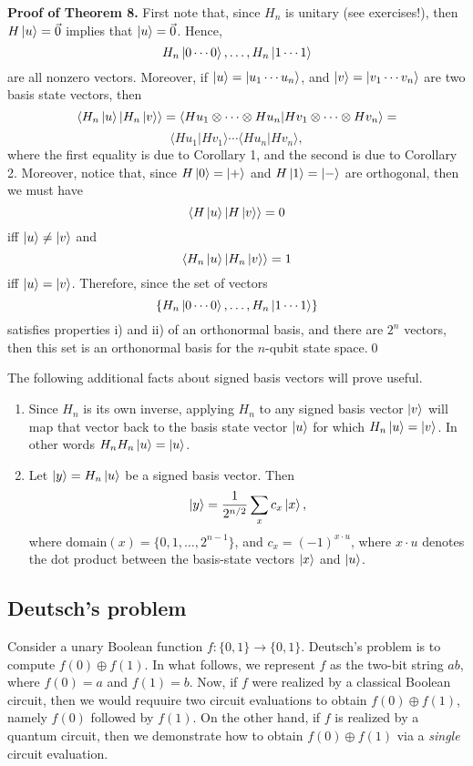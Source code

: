 \documentclass [12pt]{article}
\theoremstyle{definition}
\begin{document}
\textbf{Proof of Theorem 8.} First note that, since $H_n$ is unitary (see exercises!), then $H\ket{u}=\vec{0}$ implies that $\ket{u}=\vec{0}$.
Hence, 
\[H_n\ket{0\cdots 0}, \ldots, H_n\ket{1\cdots 1}\]
are all nonzero vectors. Moreover, if $\ket{u}=\ket{u_1\cdots u_n}$, and $\ket{v}=\ket{v_1\cdots v_n}$ are two basis state vectors, then
\[\langle H_n\ket{u}| H_n\ket{v}\rangle = \langle Hu_1\otimes\cdots\otimes Hu_n| Hv_1\otimes\cdots\otimes Hv_n\rangle=\]
\[\langle Hu_1|Hv_1\rangle\cdots \langle Hu_n|Hv_n\rangle,\]
where the first equality is due to Corollary 1, and the second is due to Corollary 2.
Moreover, notice that, since $H\ket{0}=\ket{+}$ and $H\ket{1}=\ket{-}$ are orthogonal, then we must
have 
\[\langle H\ket{u}| H\ket{v}\rangle = 0\]
iff $\ket{u}\not=\ket{v}$ and 
\[\langle H_n\ket{u}| H_n\ket{v}\rangle = 1\]
iff $\ket{u}=\ket{v}$.
Therefore, since the set of vectors
\[\{H_n\ket{0\cdots 0}, \ldots, H_n\ket{1\cdots 1}\}\]
satisfies properties i) and ii) of an orthonormal basis, and there are $2^n$ vectors, then this set 
is an orthonormal basis for the $n$-qubit state space.\qed

The following additional facts about signed basis vectors will prove useful.

\begin{enumerate}
\item Since $H_n$ is its own inverse, applying $H_n$ to any signed basis vector $\ket{v}$ will map that vector back to the 
basis state vector $\ket{u}$ for which $H_n\ket{u}=\ket{v}$. In other words $H_nH_n\ket{u}=\ket{u}$.

\item Let $\ket{y}=H_n\ket{u}$ be a signed basis vector. Then 
\[\ket{y}=\frac{1}{2^{n/2}}\sum_{x}c_x\ket{x},\]
where $\mbox{domain}(x)=\{0,1,\ldots,2^{n-1}\}$, and $c_x = (-1)^{x\cdot u}$, where 
 $x\cdot u$ denotes the dot product between the basis-state vectors $\ket{x}$ and $\ket{u}$.
\end{enumerate}



 






\newpage
\subsection*{Deutsch's problem}

Consider a unary Boolean function $f:\{0,1\}\rightarrow\{0,1\}$. Deutsch's problem is to compute $f(0)\oplus f(1)$. In what follows, we represent $f$ as the two-bit string
$ab$, where $f(0)=a$ and $f(1)=b$. Now, if $f$ were realized by a classical Boolean circuit, then
we would requuire two circuit evaluations to obtain $f(0)\oplus f(1)$, namely $f(0)$ followed by $f(1)$. On the other hand, if $f$ is realized by a quantum circuit,
then we demonstrate how to obtain 
$f(0)\oplus f(1)$ via a \textit{single} circuit evaluation.
\end{document}
